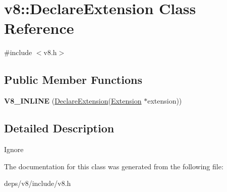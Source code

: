 \hypertarget{classv8_1_1_declare_extension}{}\section{v8\+:\+:Declare\+Extension Class Reference}
\label{classv8_1_1_declare_extension}


{\ttfamily \#include $<$v8.\+h$>$}

\subsection*{Public Member Functions}
\begin{DoxyCompactItemize}
\item 
\hypertarget{classv8_1_1_declare_extension_a3ebf7b7ece461a100100feb0090a4394}{}{\bfseries V8\+\_\+\+I\+N\+L\+I\+N\+E} (\hyperlink{classv8_1_1_declare_extension}{Declare\+Extension}(\hyperlink{classv8_1_1_extension}{Extension} $\ast$extension))\label{classv8_1_1_declare_extension_a3ebf7b7ece461a100100feb0090a4394}

\end{DoxyCompactItemize}


\subsection{Detailed Description}
Ignore 

The documentation for this class was generated from the following file\+:\begin{DoxyCompactItemize}
\item 
deps/v8/include/v8.\+h\end{DoxyCompactItemize}
